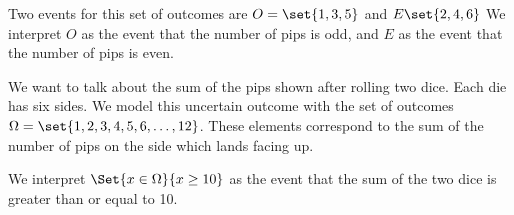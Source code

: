 Two events for this set of outcomes are $O = \set{1, 3, 5}$ and $E \set{2, 4, 6}$
We interpret $O$ as the event that the number of pips is odd, and $E$ as the event that the number of pips is even.


We want to talk about the sum of the pips shown after rolling two dice.
Each die has six sides.
We model this uncertain outcome with the set of outcomes $\Omega  = \set{1, 2, 3, 4, 5, 6, \dots, 12}$.
These elements correspond to the sum of the number of pips on the side which lands facing up.

We interpret $\Set{x \in \Omega }{x \geq 10}$ as the event that the sum of the two dice is greater than or equal to 10.

